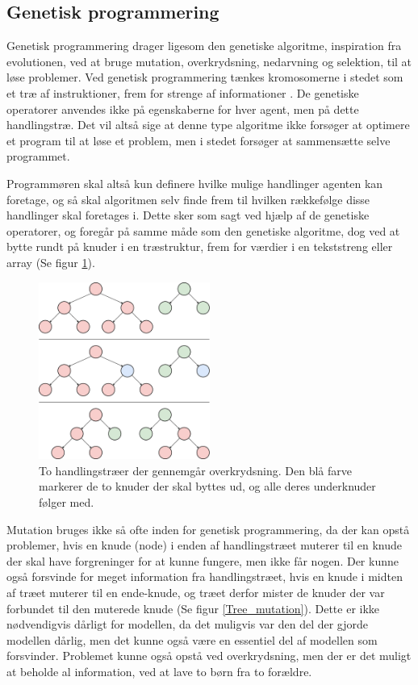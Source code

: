 \subsection{Genetisk programmering}
Genetisk programmering drager ligesom den genetiske algoritme, inspiration fra evolutionen, ved at bruge mutation, overkrydsning, nedarvning og selektion, til at løse problemer. Ved genetisk programmering tænkes kromosomerne i stedet som et træ af instruktioner, frem for strenge af informationer \cite{genetic-algorithms}. De genetiske operatorer anvendes ikke på egenskaberne for hver agent, men på dette handlingstræ. Det vil altså sige at denne type algoritme ikke forsøger at optimere et program til at løse et problem, men i stedet forsøger at sammensætte selve programmet. 
\par
Programmøren skal altså kun definere hvilke mulige handlinger agenten kan foretage, og så skal algoritmen selv finde frem til hvilken rækkefølge disse handlinger skal foretages i. Dette sker som sagt ved hjælp af de genetiske operatorer, og foregår på samme måde som den genetiske algoritme, dog ved at bytte rundt på knuder i en træstruktur, frem for værdier i en tekststreng eller array (Se figur \ref{Tree_overkrydsning}). 
\begin{figure}[H]
    \centering
    \includegraphics[width=0.5\textwidth]{figures/Overkrydsning2.png}
    \caption{To handlingstræer der gennemgår overkrydsning. Den blå farve markerer de to knuder der skal byttes ud, og alle deres underknuder følger med.}
    \label{Tree_overkrydsning}
\end{figure}
\par
Mutation bruges ikke så ofte inden for genetisk programmering, da der kan opstå problemer, hvis en knude (node) i enden af handlingstræet muterer til en knude der skal have forgreninger for at kunne fungere, men ikke får nogen. Der kunne også forsvinde for meget information fra handlingstræet, hvis en knude i midten af træet muterer til en ende-knude, og træet derfor mister de knuder der var forbundet til den muterede knude (Se figur \ref{Tree_mutation}). Dette er ikke nødvendigvis dårligt for modellen, da det muligvis var den del der gjorde modellen dårlig, men det kunne også være en essentiel del af modellen som forsvinder. Problemet kunne også opstå ved overkrydsning, men der er det muligt at beholde al information, ved at lave to børn fra to forældre.
